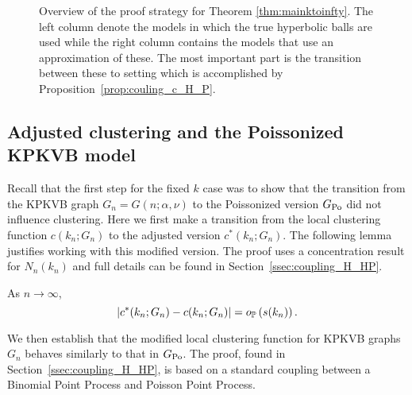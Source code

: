 \begin{figure}[!t]

\caption{Overview of the proof strategy for Theorem \ref{thm:mainktoinfty}. The left column denote the models in which the true hyperbolic balls are used while the right column contains the models that use an approximation of these. The most important part is the transition between these to setting which is accomplished by Proposition~\ref{prop:couling_c_H_P}.}
\label{fig:overview_proof}
\end{figure}


\subsection{Adjusted clustering and the Poissonized KPKVB model}\label{ssec:KPKVB_to_GPo_infinite_k}

Recall that the first step for the fixed $k$ case was to show that the transition from the KPKVB graph $G_n = G(n;\alpha,\nu)$ to the Poissonized version $G_{{\mathrm{Po}}}$ did not influence clustering. Here we first make a transition from the local clustering function $c(k_n; G_n)$ to the adjusted version $c^\ast(k_n; G_n)$. The following lemma justifies working with this modified version. The proof uses a concentration result for $N_{n}(k_n)$ and full details can be found in Section~\ref{ssec:coupling_H_HP}.

\begin{lemma}\label{lem:clustering_ast_H}
As $n \to \infty$,
\[
\left|c^\ast(k_n; G_n) - c(k_n; G_n)\right| = o_{\mathbb{P}} \left(s(k_n)\right).
\]
\end{lemma}

We then establish that the modified local clustering function for KPKVB graphs $G_n$ behaves similarly to that in $G_{{\mathrm{Po}}}$. The proof, found in Section~\ref{ssec:coupling_H_HP}, is based on a standard coupling between a Binomial Point Process and Poisson Point Process.

